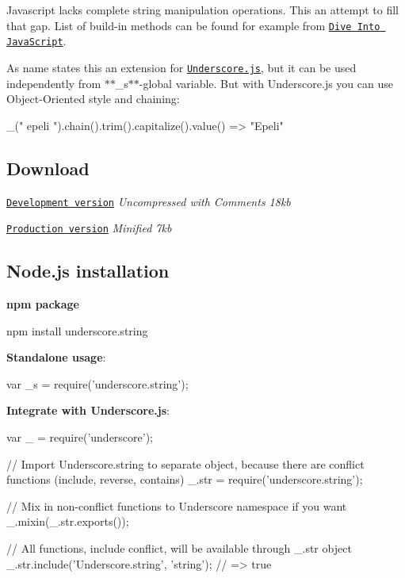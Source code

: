 Javascript lacks complete string manipulation operations. This an attempt to fill that gap. List of build-\/in methods can be found for example from \href{http://www.diveintojavascript.com/core-javascript-reference/the-string-object}{\tt Dive Into Java\+Script}.

As name states this an extension for \href{http://documentcloud.github.com/underscore/}{\tt Underscore.\+js}, but it can be used independently from $\ast$$\ast$\+\_\+s$\ast$$\ast$-\/global variable. But with Underscore.\+js you can use Object-\/\+Oriented style and chaining\+:


\begin{DoxyCode}
\_("   epeli  ").chain().trim().capitalize().value()
=> "Epeli"
\end{DoxyCode}


\subsection*{Download}


\begin{DoxyItemize}
\item \href{https://raw.github.com/epeli/underscore.string/master/lib/underscore.string.js}{\tt Development version} {\itshape Uncompressed with Comments 18kb}
\item \href{https://github.com/epeli/underscore.string/raw/master/dist/underscore.string.min.js}{\tt Production version} {\itshape Minified 7kb}
\end{DoxyItemize}

\subsection*{Node.\+js installation}

{\bfseries npm package} \begin{DoxyVerb}npm install underscore.string
\end{DoxyVerb}


{\bfseries Standalone usage}\+:


\begin{DoxyCode}
var \_s = require('underscore.string');
\end{DoxyCode}


{\bfseries Integrate with Underscore.\+js}\+:


\begin{DoxyCode}
var \_  = require('underscore');

// Import Underscore.string to separate object, because there are conflict functions (include, reverse,
       contains)
\_.str = require('underscore.string');

// Mix in non-conflict functions to Underscore namespace if you want
\_.mixin(\_.str.exports());

// All functions, include conflict, will be available through \_.str object
\_.str.include('Underscore.string', 'string'); // => true
\end{DoxyCode}


